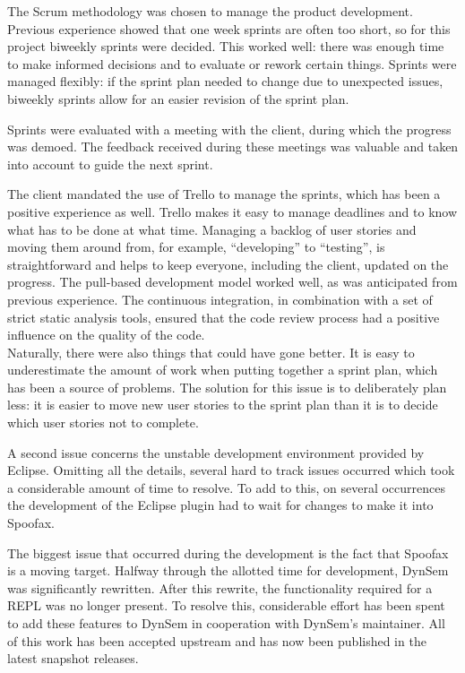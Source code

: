 The Scrum methodology was chosen to manage the product development. Previous
experience showed that one week sprints are often too short, so for this project
biweekly sprints were decided. This worked well: there was enough time to make
informed decisions and to evaluate or rework certain things. Sprints were
managed flexibly: if the sprint plan needed to change due to unexpected issues,
biweekly sprints allow for an easier revision of the sprint plan.

Sprints were evaluated with a meeting with the client, during which the progress
was demoed. The feedback received during these meetings was valuable and taken
into account to guide the next sprint.

The client mandated the use of Trello to manage the sprints, which has been a
positive experience as well. Trello makes it easy to manage deadlines and to
know what has to be done at what time. Managing a backlog of user stories and
moving them around from, for example, ``developing'' to ``testing'', is
straightforward and helps to keep everyone, including the client, updated on the
progress.
The pull-based development model worked well, as was anticipated from previous
experience. The continuous integration, in combination with a set of strict
static analysis tools, ensured that the code review process had a positive
influence on the quality of the code.\\

Naturally, there were also things that could have gone better. It is easy to
underestimate the amount of work when putting together a sprint plan, which has
been a source of problems. The solution for this issue is to deliberately plan
less: it is easier to move new user stories to the sprint plan than it is to
decide which user stories not to complete.

A second issue concerns the unstable development environment provided by Eclipse.
Omitting all the details, several hard to track issues occurred which took a
considerable amount of time to resolve. To add to this, on several occurrences
the development of the Eclipse plugin had to wait for changes to make it into
Spoofax.

The biggest issue that occurred during the development is the fact that Spoofax
is a moving target. Halfway through the allotted time for development, DynSem
was significantly rewritten. After this rewrite, the functionality required for
a REPL was no longer present. To resolve this, considerable effort has been spent
to add these features to DynSem in cooperation with DynSem's maintainer. All of
this work has been accepted upstream and has now been published in the latest
snapshot releases.\\

